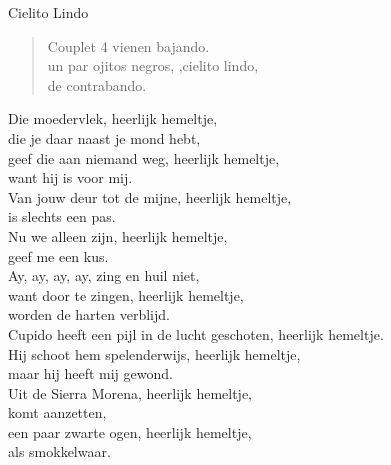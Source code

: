 \begin{song}[copla]{Cielito Lindo}
\begin{verse}{Couplet 4}
vienen bajando.\\
\chord{}un par ojitos negros, ,cielito lindo,\\
de contrabando.\\
\end{verse}
\begin{translation}
Die moedervlek, heerlijk hemeltje,\\
die je daar naast je mond hebt,\\
geef die aan niemand weg, heerlijk hemeltje,\\
want hij is voor mij.\\
\vspace{1em}
Van jouw deur tot de mijne, heerlijk hemeltje,\\
is slechts een pas.\\
Nu we alleen zijn, heerlijk hemeltje,\\
geef me een kus.\\
\vspace{1em}
Ay, ay, ay, ay, zing en huil niet,\\
want door te zingen, heerlijk hemeltje,\\
worden de harten verblijd.\\
\vspace{1em}
Cupido heeft een pijl in de lucht geschoten, heerlijk hemeltje.\\
Hij schoot hem spelenderwijs, heerlijk hemeltje,\\
maar hij heeft mij gewond.\\
\vspace{1em}
Uit de Sierra Morena, heerlijk hemeltje,\\
komt aanzetten,\\
een paar zwarte ogen, heerlijk hemeltje,\\
als smokkelwaar.\\
\end{translation}
\end{song}
